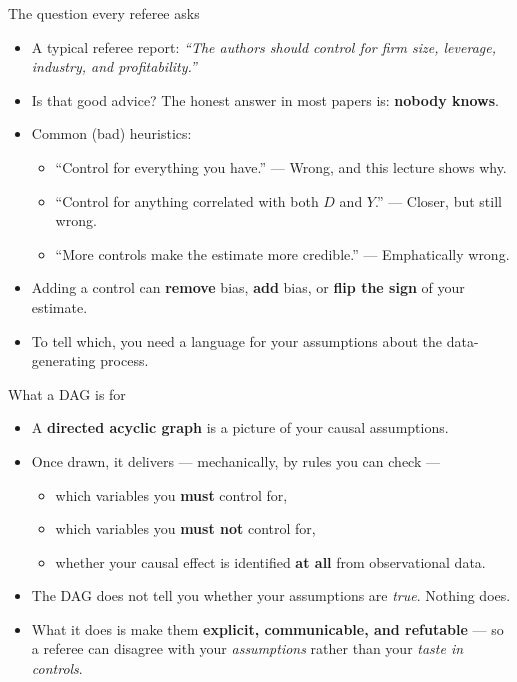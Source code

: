 \documentclass[
  11pt,
  ignorenonframetext,
  aspectratio=169,
]{beamer}
\providecommand{\tightlist}{%
  \setlength{\itemsep}{0pt}\setlength{\parskip}{0pt}}
\begin{document}
\begin{frame}{The question every referee asks}
\protect{}\label{the-question-every-referee-asks}
\begin{itemize}
\tightlist
\item
  A typical referee report: \emph{``The authors should control for firm
  size, leverage, industry, and profitability.''}
\item
  Is that good advice? The honest answer in most papers is:
  \textbf{nobody knows}.
\item
  Common (bad) heuristics:

  \begin{itemize}
  \tightlist
  \item
    ``Control for everything you have.'' --- Wrong, and this lecture
    shows why.
  \item
    ``Control for anything correlated with both \(D\) and \(Y\).'' ---
    Closer, but still wrong.
  \item
    ``More controls make the estimate more credible.'' --- Emphatically
    wrong.
  \end{itemize}
\item
  Adding a control can \textbf{remove} bias, \textbf{add} bias, or
  \textbf{flip the sign} of your estimate.
\item
  To tell which, you need a language for your assumptions about the
  data-generating process.
\end{itemize}
\end{frame}

\begin{frame}{What a DAG is for}
\protect{}\label{what-a-dag-is-for}
\begin{itemize}
\tightlist
\item
  A \textbf{directed acyclic graph} is a picture of your causal
  assumptions.
\item
  Once drawn, it delivers --- mechanically, by rules you can check ---

  \begin{itemize}
  \tightlist
  \item
    which variables you \textbf{must} control for,
  \item
    which variables you \textbf{must not} control for,
  \item
    whether your causal effect is identified \textbf{at all} from
    observational data.
  \end{itemize}
\item
  The DAG does not tell you whether your assumptions are \emph{true}.
  Nothing does.
\item
  What it does is make them \textbf{explicit, communicable, and
  refutable} --- so a referee can disagree with your \emph{assumptions}
  rather than your \emph{taste in controls}.
\end{itemize}
\end{frame}
\end{document}
